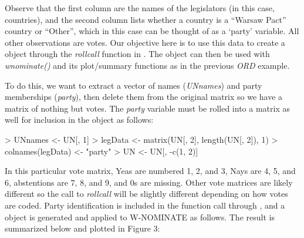 \documentclass[12pt]{article}
\begin{document}
Observe that the first column are the names of the legislators
(in this case, countries), and the second column lists whether a
country is a ``Warsaw Pact'' country or ``Other'', which in this case can
be thought of as a `party' variable.  All other observations are votes.
Our objective here is to use this data to create a \verb@rollcall@ object
through the \emph{rollcall} function in \verb@pscl@.  The object can then
be used with \emph{wnominate()} and its plot/summary functions as in the
previous \emph{ORD} example.

To do this, we want to extract a vector of names (\emph{UNnames}) and party
memberships (\emph{party}), then delete them from the original matrix so we
have a matrix of nothing but votes. The \emph{party} variable must be rolled
into a matrix as well for inclusion in the \verb@rollcall@ object as
follows:

\begin{Schunk}
\begin{Sinput}
> UNnames <- UN[, 1]
> legData <- matrix(UN[, 2], length(UN[, 2]), 1)
> colnames(legData) <- "party"
> UN <- UN[, -c(1, 2)]
\end{Sinput}
\end{Schunk}

In this particular vote matrix, Yeas are numbered 1, 2, and 3, Nays are
4, 5, and 6, abstentions are 7, 8, and 9, and 0s are missing.  Other vote
matrices are likely different so the call to \emph{rollcall} will be slightly
different depending on how votes are coded.  Party identification is included
in the function call through \verb@legData@, and a \verb@rollcall@ object is
generated and applied to W-NOMINATE as follows.  The result is summarized below
and plotted in Figure 3:
\end{document}
